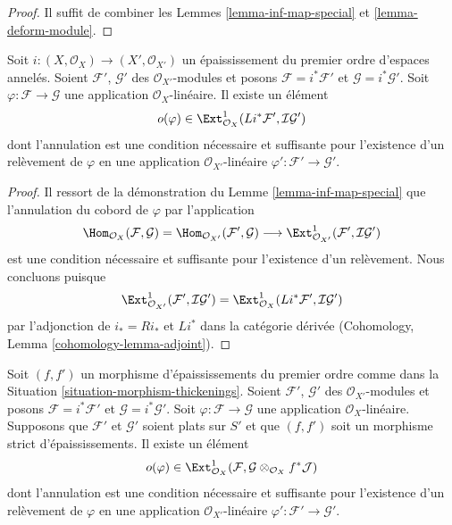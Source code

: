 \begin{proof}
Il suffit de combiner les Lemmes \ref{lemma-inf-map-special} et
\ref{lemma-deform-module}.
\end{proof}

\begin{lemma}
\label{lemma-inf-obs-map-special}
Soit $i : (X, \mathcal{O}_X) \to (X', \mathcal{O}_{X'})$
un épaississement du premier ordre d'espaces annelés.
Soient $\mathcal{F}'$, $\mathcal{G}'$ des $\mathcal{O}_{X'}$-modules et posons
$\mathcal{F} = i^*\mathcal{F}'$ et $\mathcal{G} = i^*\mathcal{G}'$.
Soit $\varphi : \mathcal{F} \to \mathcal{G}$ une application
$\mathcal{O}_X$-linéaire.
Il existe un élément
$$
o(\varphi) \in
\Ext^1_{\mathcal{O}_X}(Li^*\mathcal{F}',
\mathcal{I}\mathcal{G}')
$$
dont l'annulation est une condition nécessaire et suffisante pour
l'existence d'un relèvement de $\varphi$ en une application
$\mathcal{O}_{X'}$-linéaire
$\varphi' : \mathcal{F}' \to \mathcal{G}'$.
\end{lemma}

\begin{proof}
Il ressort de la démonstration du Lemme \ref{lemma-inf-map-special} que
l'annulation du cobord de $\varphi$ par l'application
$$
\Hom_{\mathcal{O}_X}(\mathcal{F}, \mathcal{G}) =
\Hom_{\mathcal{O}_{X'}}(\mathcal{F}', \mathcal{G}) \longrightarrow
\Ext^1_{\mathcal{O}_{X'}}(\mathcal{F}', \mathcal{I}\mathcal{G}')
$$
est une condition nécessaire et suffisante pour l'existence d'un relèvement. Nous
concluons puisque
$$
\Ext^1_{\mathcal{O}_{X'}}(\mathcal{F}', \mathcal{I}\mathcal{G}') =
\Ext^1_{\mathcal{O}_X}(Li^*\mathcal{F}', \mathcal{I}\mathcal{G}')
$$
par l'adjonction de $i_* = Ri_*$ et $Li^*$ dans la catégorie dérivée
(Cohomology, Lemma \ref{cohomology-lemma-adjoint}).
\end{proof}

\begin{lemma}
\label{lemma-inf-obs-map-rel}
Soit $(f, f')$ un morphisme d'épaississements du
premier ordre comme dans la Situation \ref{situation-morphism-thickenings}.
Soient $\mathcal{F}'$, $\mathcal{G}'$ des $\mathcal{O}_{X'}$-modules et posons
$\mathcal{F} = i^*\mathcal{F}'$ et $\mathcal{G} = i^*\mathcal{G}'$.
Soit $\varphi : \mathcal{F} \to \mathcal{G}$ une application
$\mathcal{O}_X$-linéaire.
Supposons que $\mathcal{F}'$ et $\mathcal{G}'$ soient plats sur $S'$ et
que $(f, f')$ soit un morphisme strict d'épaississements. Il existe un élément
$$
o(\varphi) \in  \Ext^1_{\mathcal{O}_X}(\mathcal{F},
\mathcal{G} \otimes_{\mathcal{O}_X} f^*\mathcal{J})
$$
dont l'annulation est une condition nécessaire et suffisante pour
l'existence d'un relèvement de $\varphi$ en une application
$\mathcal{O}_{X'}$-linéaire
$\varphi' : \mathcal{F}' \to \mathcal{G}'$.
\end{lemma}

